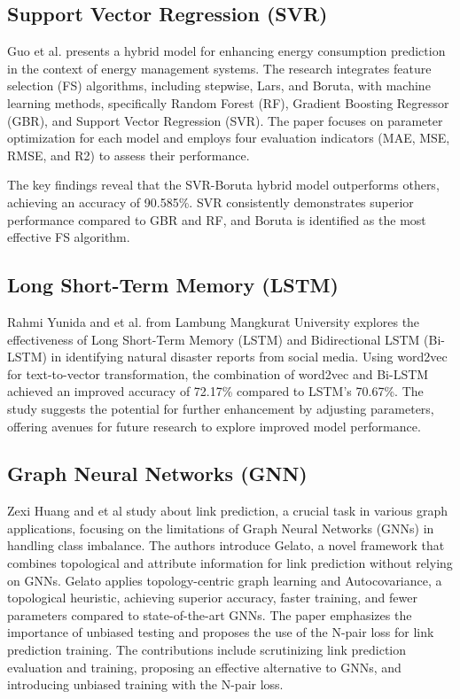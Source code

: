 \documentclass{ieeeojies}
\begin{document}
\subsection{\textbf{Support Vector Regression (SVR)}}
\hspace{0.3cm}Guo et al.\cite{article2} presents a hybrid model for enhancing energy consumption prediction in the context of energy management systems. The research integrates feature selection (FS) algorithms, including stepwise, Lars, and Boruta, with machine learning methods, specifically Random Forest (RF), Gradient Boosting Regressor (GBR), and Support Vector Regression (SVR). The paper focuses on parameter optimization for each model and employs four evaluation indicators (MAE, MSE, RMSE, and R2) to assess their performance.

The key findings reveal that the SVR-Boruta hybrid model outperforms others, achieving an accuracy of 90.585\%. SVR consistently demonstrates superior performance compared to GBR and RF, and Boruta is identified as the most effective FS algorithm. 

\subsection{\textbf{Long Short-Term Memory (LSTM)}}
\hspace{0.3cm}Rahmi Yunida and et al.\cite{article1} from Lambung Mangkurat University explores the effectiveness of Long Short-Term Memory (LSTM) and Bidirectional LSTM (Bi-LSTM) in identifying natural disaster reports from social media. Using word2vec for text-to-vector transformation, the combination of word2vec and Bi-LSTM achieved an improved accuracy of 72.17\% compared to LSTM's 70.67\%. The study suggests the potential for further enhancement by adjusting parameters, offering avenues for future research to explore improved model performance.

\subsection{\textbf{Graph Neural Networks (GNN)}}
\hspace{0.3cm}Zexi Huang and et al\cite{unknown} study about link prediction, a crucial task in various graph applications, focusing on the limitations of Graph Neural Networks (GNNs) in handling class imbalance. The authors introduce Gelato, a novel framework that combines topological and attribute information for link prediction without relying on GNNs. Gelato applies topology-centric graph learning and Autocovariance, a topological heuristic, achieving superior accuracy, faster training, and fewer parameters compared to state-of-the-art GNNs. The paper emphasizes the importance of unbiased testing and proposes the use of the N-pair loss for link prediction training. The contributions include scrutinizing link prediction evaluation and training, proposing an effective alternative to GNNs, and introducing unbiased training with the N-pair loss.
\end{document}
